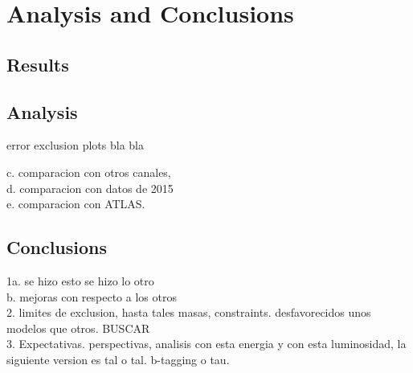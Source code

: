 


\chapter[Conclusions]{Analysis and Conclusions}
\label{chap:Conclusions}


\section{Results}
\label{sec:Results}

\section{Analysis}
error exclusion plots bla bla

c. comparacion con otros canales, \\
d. comparacion con datos de 2015\\
e. comparacion con ATLAS.\\ 

\section{Conclusions}

1a. se hizo esto se hizo lo otro \\
b. mejoras con respecto a los otros\\

2. limites de exclusion, hasta tales masas, constraints. desfavorecidos unos modelos que otros. BUSCAR \\

3. Expectativas. perspectivas, analisis con esta energia y con esta luminosidad, la siguiente version es tal o tal. b-tagging o tau.\\

